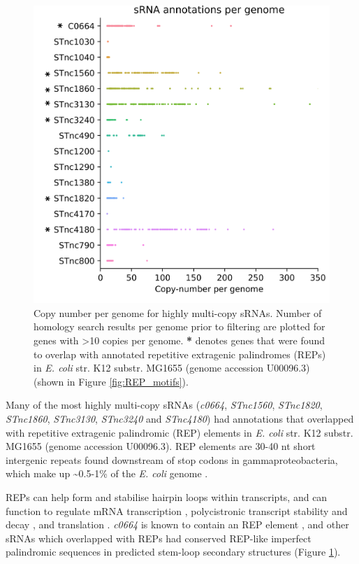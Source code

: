 \begin{figure}[H]
    \centering
        \includegraphics{sal/copy_number.png}
    \caption[Copy number per genome for multi-copy sRNAs.]{Copy number per genome for highly multi-copy sRNAs. Number of homology search results per genome prior to filtering are plotted for genes with >10 copies per genome. \textbf{*} denotes genes that were found to overlap with annotated repetitive extragenic palindromes (REPs) in \textit{E. coli} str. K12 substr. MG1655 (genome accession U00096.3) (shown in Figure \ref{fig:REP_motifs}). }
    \label{fig:copy_number}
\end{figure}
\newpage
Many of the most highly multi-copy sRNAs (\textit{c0664}, \textit{STnc1560}, \textit{STnc1820}, \textit{STnc1860}, \textit{STnc3130}, \textit{STnc3240} and \textit{STnc4180}) had annotations that overlapped with repetitive extragenic palindromic (REP) elements in \textit{E. coli} str. K12 substr. MG1655 (genome accession U00096.3). REP elements are 30-40 nt short intergenic repeats found downstream of stop codons in gammaproteobacteria, which make up \textasciitilde0.5-1\% of the \textit{E. coli} genome \citep{Stern1984-eq,Dimri1992-uf}. 

REPs can help form and stabilise hairpin loops within transcripts, and can function to regulate mRNA transcription \citep{Espeli2001-bk}, polycistronic transcript stability and decay \citep{Khemici2004-ch}, and translation \citep{Liang2015-yy}. \textit{c0664} is known to contain an REP element \citep{Hershberg2003-qxi}, and other sRNAs which overlapped with REPs had conserved REP-like imperfect palindromic sequences in predicted stem-loop secondary structures (Figure \ref{fig:copy_number}).

